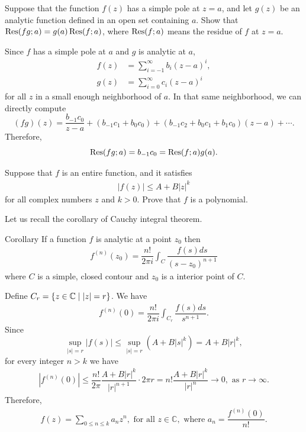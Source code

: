 \begin{problem}
Suppose that the function $f(z)$ has a simple pole at $z = a$, and let $g(z)$ be an analytic function defined in an open set containing $a$. Show that $\operatorname{Res}(fg; a) = g(a) \operatorname{Res}(f; a)$, where $\operatorname{Res}(f; a)$ means the residue of $f$ at $z = a$.
\begin{solution}
Since $f$ has a simple pole at $a$ and $g$ is analytic at $a$,
\begin{align*}
    f(z) &= \sum_{i = -1}^\infty b_i (z - a)^i, \\
    g(z) &= \sum_{i =  0}^\infty c_i (z - a)^i
\end{align*}
for all $z$ in a small enough neighborhood of $a$. In that same neighborhood, we can directly compute
$$ (fg)(z) = \frac{b_{-1} c_0}{z-a} + (b_{-1} c_1 + b_0 c_0) + (b_{-1} c_2 + b_0 c_1 + b_1 c_0)(z-a) + \cdots. $$
Therefore,
$$ \operatorname{Res}(fg;a) = b_{-1} c_0 = \operatorname{Res}(f;a) g(a). $$
\end{solution}
\end{problem}

\begin{problem}
Suppose that $f$ is an entire function, and it satisfies
\begin{align*}
    |f(z)|\le A+B|z|^k
\end{align*}
for all complex numbers $z$ and $k>0.$ Prove that $f$ is a polynomial.
\begin{solution}
Let us recall the corollary of Cauchy integral theorem.
\begin{thmbox}{Corollary}
If a function $f$ is analytic at a point $z_0$ then 
\begin{align*}
    f^{(n)}(z_0)=\dfrac{n!}{2\pi i}\int_C \dfrac{f(s)ds}{(s-z_0)^{n+1}}
\end{align*}
where $C$ is a simple, closed contour and $z_0$ is a interior point of $C.$
\end{thmbox}
Define $C_r=\left\{ z\in \mathbb{C} \mid |z|=r\right\}$. We have 
\begin{align*}
    f^{(n)}(0)=\dfrac{n!}{2\pi i}\int_{C_r} \dfrac{f(s)ds}{s^{n+1}}.
\end{align*}
Since $$\sup_{|s|=r} |f(s)|\le \sup_{|s|=r} (A+B|s|^k)=A+B|r|^k,$$ for every integer $n> k$ we have
\begin{align*}
    |f^{(n)}(0)|\le \dfrac{n!}{2\pi}\dfrac{A+B|r|^k}{|r|^{n+1}}\cdot 2\pi r={n!}\dfrac{A+B|r|^k}{|r|^{n}}\rightarrow 0,\text{ as }r\rightarrow\infty.
\end{align*}
Therefore,
\begin{align*}
    f(z)=\sum_{0\le n\le k}a_nz^n,\text{ for all }z\in\mathbb{C},\text{ where }a_n=\dfrac{f^{(n)}(0)}{n!}.
\end{align*}
\end{solution}
\end{problem}

